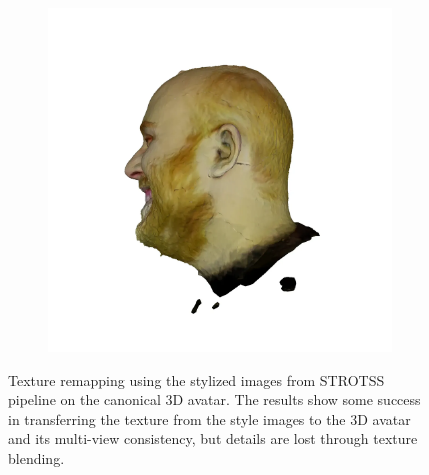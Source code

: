 \begin{figure}
\begin{subfigure}{0.18\linewidth}
        \includegraphics[width=\textwidth]{Figures/failed/stross/3d/snapshot23.png}
	\end{subfigure}
    \caption{Texture remapping using the stylized images from STROTSS pipeline on the canonical 3D avatar. The results show some success in transferring the texture from the style images to the 3D avatar and its multi-view consistency, but details are lost through texture blending.}
    \label{fig:stross_texture_fit}

\end{figure}


